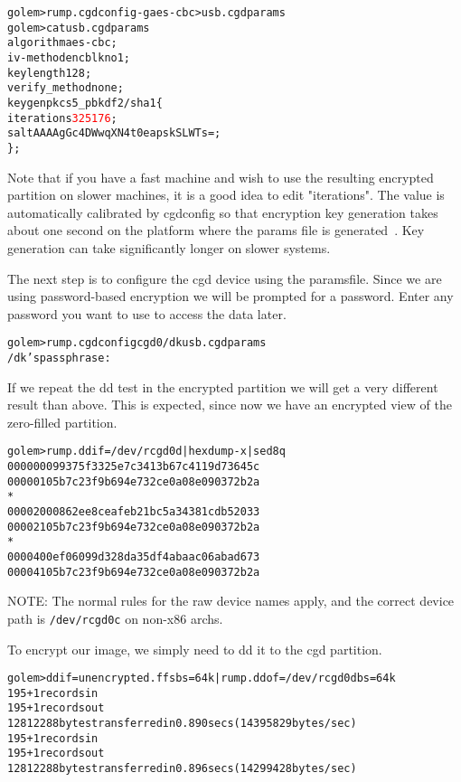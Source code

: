 {\footnotesize
\begin{alltt}
golem> rump.cgdconfig -g aes-cbc > usb.cgdparams
golem> cat usb.cgdparams 
algorithm aes-cbc;
iv-method encblkno1;
keylength 128;
verify_method none;
keygen pkcs5_pbkdf2/sha1 \{
        iterations \textcolor{red}{325176};
        salt AAAAgGc4DWwqXN4t0eapskSLWTs=;
\};
\end{alltt}}

Note that if you have a fast machine and wish to use the resulting
encrypted partition on slower machines, it is a good idea to edit
"iterations".  The value is automatically calibrated by cgdconfig
so that encryption key generation takes about one second on the
platform where the params file is generated~\cite{dowdeswell:cgd}.
Key generation can take significantly longer on slower systems.

The next step is to configure the cgd device using the paramsfile.
Since we are using password-based encryption we will be prompted
for a password.  Enter any password you want to use to access the data
later.

{\footnotesize
\begin{alltt}
golem> rump.cgdconfig cgd0 /dk usb.cgdparams
/dk's passphrase:
\end{alltt}}

If we repeat the dd test in the encrypted partition we will get a
very different result than above.  This is expected, since now we
have an encrypted view of the zero-filled partition.

{\footnotesize
\begin{alltt}
golem> rump.dd if=/dev/rcgd0d | hexdump -x | sed 8q
0000000    9937    5f33    25e7    c341    3b67    c411    9d73    645c
0000010    5b7c    23f9    b694    e732    ce0a    08e0    9037    2b2a
*
0000200    0862    ee8c    eafe    b21b    c5a3    4381    cdb5    2033
0000210    5b7c    23f9    b694    e732    ce0a    08e0    9037    2b2a
*
0000400    ef06    099d    328d    a35d    f4ab    aac0    6aba    d673
0000410    5b7c    23f9    b694    e732    ce0a    08e0    9037    2b2a
\end{alltt}}

NOTE: The normal rules for the raw device names apply, and the
correct device path is \verb+/dev/rcgd0c+ on non-x86 archs.

To encrypt our image, we simply need to dd it to the cgd partition.

{\footnotesize
\begin{alltt}
golem> dd if=unencrypted.ffs bs=64k | rump.dd of=/dev/rcgd0d bs=64k
195+1 records in
195+1 records out
12812288 bytes transferred in 0.890 secs (14395829 bytes/sec)
195+1 records in
195+1 records out
12812288 bytes transferred in 0.896 secs (14299428 bytes/sec)
\end{alltt}}

